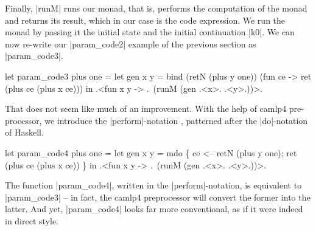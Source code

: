 \documentclass[draft]{elsart}
\begin{document}
Finally, |runM| runs our monad, that is, performs the computation of
the monad and returns its result, which in our case is the code
expression. We run the monad by passing it the initial state and the
initial continuation |k0|. We can now re-write our |param_code2|
example of the previous section as |param_code3|.
\begin{code}
let param_code3 plus one =
  let gen x y = bind (retN (plus y one)) (fun ce -> 
                ret (plus ce (plus x ce)))
  in .<fun x y -> .~(runM (gen .<x>. .<y>.))>.
\end{code}
%
That does not seem like much of an improvement. With the help of
camlp4 pre-processor, we introduce the |perform|-notation \cite{metamonadsURL},
patterned after the |do|-notation of Haskell. 
\begin{code}
let param_code4 plus one =
  let gen x y = mdo \{ ce <-- retN (plus y one);
                      ret (plus ce (plus x ce)) \}
  in .<fun x y -> .~(runM (gen .<x>. .<y>.))>.
\end{code}
The function
|param_code4|, written in the |perform|-notation, is equivalent to
|param_code3| -- in fact, the camlp4 preprocessor will convert the
former into the latter. And yet, |param_code4| looks far more
conventional, as if it were indeed in direct style.
\end{document}
